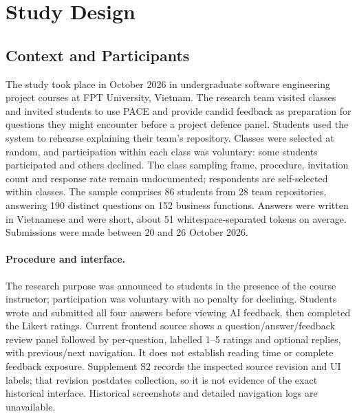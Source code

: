 \documentclass[runningheads]{llncs}
\begin{document}
\section{Study Design}
\label{sec:method}

\subsection{Context and Participants}
The study took place in October 2026 in undergraduate software engineering project courses at FPT University, Vietnam. The research team visited classes and invited students to use PACE and provide candid feedback as preparation for questions they might encounter before a project defence panel. Students used the system to rehearse explaining their team's repository. Classes were selected at random, and participation within each class was voluntary: some students participated and others declined. The class sampling frame, procedure, invitation count and response rate remain undocumented; respondents are self-selected within classes.
 The sample comprises 86 students from 28 team repositories, answering 190 distinct questions on 152 business functions. Answers were written in Vietnamese and were short, about 51 whitespace-separated tokens on average. Submissions were made between 20 and 26 October 2026.

\paragraph{Procedure and interface.}
The research purpose was announced to students in the presence of the course instructor; participation was voluntary with no penalty for declining. Students wrote and submitted all four answers before viewing AI feedback, then completed the Likert ratings. Current frontend source shows a question/answer/feedback review panel followed by per-question, labelled 1--5 ratings and optional replies, with previous/next navigation. It does not establish reading time or complete feedback exposure. Supplement S2 records the inspected source revision and UI labels; that revision postdates collection, so it is not evidence of the exact historical interface. Historical screenshots and detailed navigation logs are unavailable.
\end{document}
